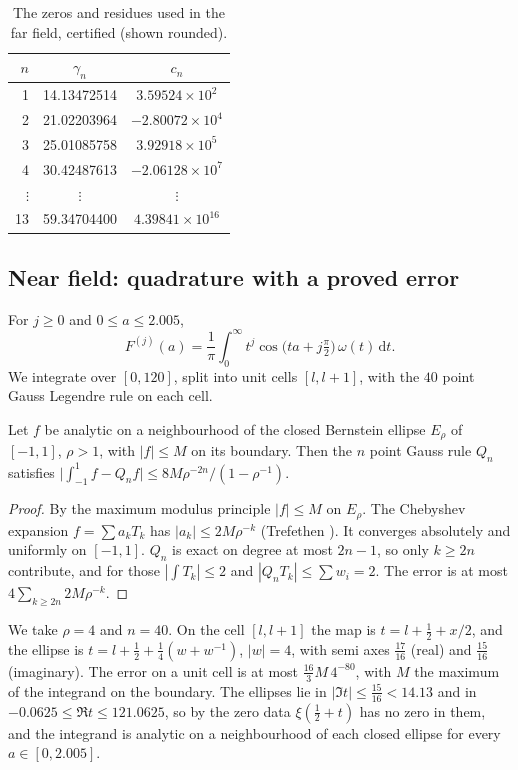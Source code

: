 \begin{table}[t]
\centering
\footnotesize
\begin{tabular}{rcc}
\toprule
$n$ & $\gamma_n$ & $c_n$\\
\midrule
1 & 14.13472514 & $3.59524\times10^{2}$\\
2 & 21.02203964 & $-2.80072\times10^{4}$\\
3 & 25.01085758 & $3.92918\times10^{5}$\\
4 & 30.42487613 & $-2.06128\times10^{7}$\\
$\vdots$ & $\vdots$ & $\vdots$\\
13 & 59.34704400 & $4.39841\times10^{16}$\\
\bottomrule
\end{tabular}
\caption{The zeros and residues used in the far field, certified (shown rounded).}
\label{p:tab:res}
\end{table}

\subsection{Near field: quadrature with a proved error}

For $j\ge0$ and $0\le a\le2.005$,
\[
F^{(j)}(a)=\frac1\pi\int_0^\infty t^j\cos\big(ta+j\tfrac\pi2\big)\,\omega(t)\,\mathrm dt .
\]
We integrate over $[0,120]$, split into unit cells $[l,l+1]$, with the $40$ point Gauss Legendre rule on each cell.

\begin{lemma}\label{p:lem:gauss}
Let $f$ be analytic on a neighbourhood of the closed Bernstein ellipse $E_\rho$ of $[-1,1]$, $\rho>1$, with $|f|\le M$ on its boundary. Then the $n$ point Gauss rule $Q_n$ satisfies $\big|\int_{-1}^1f-Q_nf\big|\le 8M\rho^{-2n}/(1-\rho^{-1})$.
\end{lemma}

\begin{proof}
By the maximum modulus principle $|f|\le M$ on $E_\rho$. The Chebyshev expansion $f=\sum a_kT_k$ has $|a_k|\le2M\rho^{-k}$ (Trefethen \cite[Theorem 8.1]{Trefethen19}). It converges absolutely and uniformly on $[-1,1]$. $Q_n$ is exact on degree at most $2n-1$, so only $k\ge2n$ contribute, and for those $|\int T_k|\le2$ and $|Q_nT_k|\le\sum w_i=2$. The error is at most $4\sum_{k\ge2n}2M\rho^{-k}$.
\end{proof}

We take $\rho=4$ and $n=40$. On the cell $[l,l+1]$ the map is $t=l+\frac12+x/2$, and the ellipse is $t=l+\frac12+\frac14(w+w^{-1})$, $|w|=4$, with semi axes $\frac{17}{16}$ (real) and $\frac{15}{16}$ (imaginary). The error on a unit cell is at most $\frac{16}3M\,4^{-80}$, with $M$ the maximum of the integrand on the boundary. The ellipses lie in $|\Im t|\le\frac{15}{16}<14.13$ and in $-0.0625\le\Re t\le121.0625$, so by the zero data $\xi(\frac12+t)$ has no zero in them, and the integrand is analytic on a neighbourhood of each closed ellipse for every $a\in[0,2.005]$.

